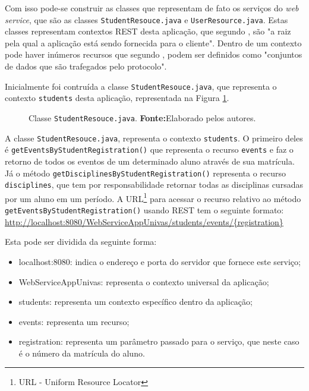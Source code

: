 	\par Com isso pode-se construir as classes que representam de fato os serviços
do \textit{web service}, que são as classes \texttt{StudentResouce.java} e
\texttt{UserResource.java}. Estas classes representam contextos REST desta
aplicação, que segundo , são "a raiz pela qual a
aplicação está sendo fornecida para o cliente". Dentro de um contexto pode haver
inúmeros recursos que segundo , podem ser definidos
como "conjuntos de dados que são trafegados pelo protocolo".

	\par Inicialmente foi contruída a classe \texttt{StudentResouce.java}, que
representa o contexto \texttt{students} desta aplicação, representada na Figura
\ref{fig:desws25_1}.

	\begin{figure}[h!]
		
		\caption[Classe StudentResouce.java]{Classe \texttt{StudentResouce.java}.
		\textbf{Fonte:}Elaborado pelos autores.}
		\label{fig:desws25_1}
	\end{figure}
		
	\par A classe \texttt{StudentResouce.java}, representa o contexto
\texttt{students}. O primeiro deles é \texttt{getEventsByStudentRegistration()}
que representa o recurso \texttt{events} e faz o retorno de todos os eventos de
um determinado aluno através de sua matrícula. Já o método
\texttt{getDisciplinesByStudentRegistration()} representa o recurso
\texttt{disciplines}, que tem por responsabilidade retornar todas as
disciplinas cursadas por um aluno em um período. A URL\footnote{URL - Uniform
Resource Locator} para acessar o recurso relativo ao método
\texttt{getEventsByStudentRegistration()} usando REST tem o seguinte formato:\\
\url{http://localhost:8080/WebServiceAppUnivas/students/events/{registration}}
	
	\par Esta pode ser dividida da seguinte forma:

	\begin{itemize}
	  \item localhost:8080: indica o endereço e porta do servidor que fornece este
	  serviço;
	  \item WebServiceAppUnivas: representa o contexto universal da aplicação; 
	  \item students: representa um contexto específico dentro da aplicação;
	  \item events: representa um recurso;
	  \item registration: representa um parâmetro passado para o serviço, que
	  neste caso é o número da matrícula do aluno.
	\end{itemize}

